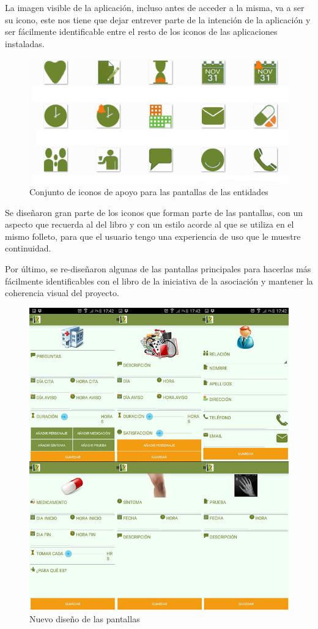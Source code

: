 \documentclass[../pfc.tex]{subfiles}
\begin{document}
	
	La imagen visible de la aplicación, incluso antes de acceder a la misma, va a ser su icono, este nos tiene que dejar entrever parte de la intención de la aplicación y ser fácilmente identificable entre el resto de los iconos de las aplicaciones instaladas.
	
			\begin{figure}[H]
				\centering
				\includegraphics[width=0.7\linewidth]{../images/iconografia}
				\caption{Conjunto de iconos de apoyo para las pantallas de las entidades}
				\label{fig:iconografia}
			\end{figure}	
	
	
	Se diseñaron gran parte de los iconos que forman parte de las pantallas, con un aspecto que recuerda al del libro y con un estilo acorde al que se utiliza en el mismo folleto, para que el usuario tengo una experiencia de uso que le muestre continuidad.
	
	Por último, se re-diseñaron algunas de las pantallas principales para hacerlas más fácilmente identificables con el libro de la iniciativa de la asociación y mantener la coherencia visual del proyecto.
	
	  
			\begin{figure}[H]
				\centering
				\includegraphics[width=1\linewidth]{../images/new_prot}
				\caption{Nuevo diseño de las pantallas }
				\label{fig:rediseno}
			\end{figure}
	
	
	
	
\end{document}
